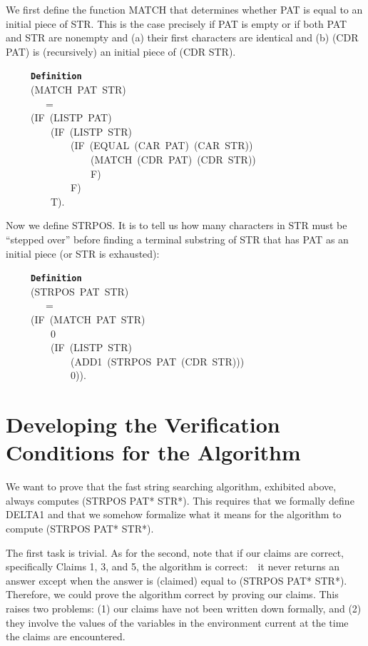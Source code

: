 \documentclass[11pt]{book}
\newenvironment{pubasis}{\begin{flushleft}\ttfamily\small}{\normalsize\rmfamily\end{flushleft}}
\newcommand{\axiomordefinition}[1]{\vspace{6pt}\texttt{\textbf{#1}}}
\newcommand{\pubdefaulttextsize}{\large}
\begin{document}
We first define the function MATCH that determines whether PAT
is equal to an initial piece of STR.  This is the case precisely if PAT is empty
or if both PAT and STR are nonempty and (a) their first characters
are identical and (b) (CDR PAT) is (recursively) an initial piece of (CDR STR).
\begin{pubasis}
~~~~~\axiomordefinition{Definition}\\
~~~~~(MATCH~PAT~STR)\\
~~~~~~~~=\\
~~~~~(IF~(LISTP~PAT)\\
~~~~~~~~~(IF~(LISTP~STR)\\
~~~~~~~~~~~~~(IF~(EQUAL~(CAR~PAT)~(CAR~STR))\\
~~~~~~~~~~~~~~~~~(MATCH~(CDR~PAT)~(CDR~STR))\\
~~~~~~~~~~~~~~~~~F)\\
~~~~~~~~~~~~~F)\\
~~~~~~~~~T).\\
\end{pubasis}
Now we define STRPOS.  It is to tell us how many characters in STR
must be ``stepped over'' before finding a terminal substring of STR
that has PAT as an initial piece (or STR is exhausted):
\begin{pubasis}
~~~~~\axiomordefinition{Definition}\\
~~~~~(STRPOS~PAT~STR)\\
~~~~~~~~=\\
~~~~~(IF~(MATCH~PAT~STR)\\
~~~~~~~~~0\\
~~~~~~~~~(IF~(LISTP~STR)\\
~~~~~~~~~~~~~(ADD1~(STRPOS~PAT~(CDR~STR)))\\
~~~~~~~~~~~~~0)).\\
\end{pubasis}
\section{Developing the Verification Conditions for the Algorithm}
\pubdefaulttextsize
We want to prove that the fast string searching algorithm,
exhibited above, always computes
(STRPOS PAT* STR*).  This requires that we formally define DELTA1 and
that we somehow formalize what it means for the algorithm to compute
(STRPOS PAT* STR*).

The first task is trivial.  As for the second, note that if our claims are correct, specifically Claims 1,
3, and 5, the algorithm is correct:~~it never returns an answer except
when the answer is (claimed) equal to (STRPOS PAT* STR*).  Therefore,
we could prove the algorithm correct by proving our claims.  This raises
two problems: (1) our claims have not been written down formally, and
(2) they involve the values of the variables in the
environment current at the time the claims are encountered.
\end{document}
